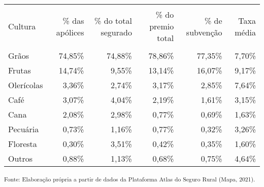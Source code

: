 \footnotesize
\vspace{0.05cm}
\begin{tabularx}{\textwidth}{lRRRRR}
    \hline \\[-1.9ex]	 
    Cultura    & \% das apólices & \% do total segurado & \% do premio total & \% de subvenção & Taxa média \\
    \hline \\[-1.9ex]	 
    Grãos      & 74,85\%         & 74,88\%              & 78,86\%            & 77,35\%         & 7,70\%     \\
    Frutas     & 14,74\%         & 9,55\%               & 13,14\%            & 16,07\%         & 9,17\%     \\
    Olerícolas & 3,36\%          & 2,74\%               & 3,17\%             & 2,85\%          & 7,64\%     \\
    Café       & 3,07\%          & 4,04\%               & 2,19\%             & 1,61\%          & 3,15\%     \\
    Cana       & 2,08\%          & 2,98\%               & 0,77\%             & 0,69\%          & 1,63\%     \\
    Pecuária   & 0,73\%          & 1,16\%               & 0,77\%             & 0,32\%          & 3,26\%     \\
    Floresta   & 0,30\%          & 3,51\%               & 0,42\%             & 0,35\%          & 1,60\%     \\
    Outros     & 0,88\%          & 1,13\%               & 0,68\%             & 0,75\%          & 4,64\%     \\ 
    \hline 
\end{tabularx}
\small \textsuperscript{Fonte: Elaboração própria a partir de dados da Plataforma Atlas do Seguro Rural (Mapa, 2021).  }\\